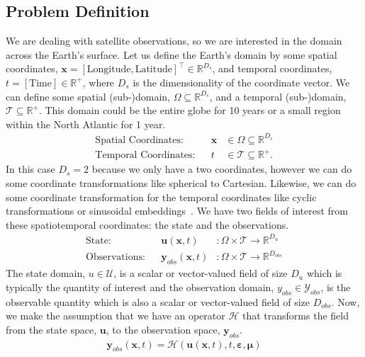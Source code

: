 \subsection{Problem Definition}\label{sec:prob_definition}

We are dealing with satellite observations, so we are interested in the domain across the Earth's surface. 
Let us define the Earth's domain by some spatial coordinates, $\mathbf{x} = [\text{Longitude},\text{Latitude}]^\top \in\mathbb{R}^{D_s}$, and temporal coordinates, $t=[\text{Time}]\in\mathbb{R}^+$, where $D_s$ is the dimensionality of the coordinate vector.  
We can define some spatial (sub-)domain, $\Omega\subseteq\mathbb{R}^{D_s}$, and a temporal (sub-)domain, $\mathcal{T}\subseteq\mathbb{R}^+$. 
This domain could be the entire globe for 10 years or a small region within the North Atlantic for 1 year.
%
%
\begin{align}  \label{eq:spatiotemporal_coords}
    \text{Spatial Coordinates}: && \mathbf{x} &\in \Omega \subseteq \mathbb{R}^{D_s}\\ 
    \text{Temporal Coordinates}: && t &\in \mathcal{T} \subseteq \mathbb{R}^+.
\end{align}
%
%
In this case $D_s=2$ because we only have a two coordinates, however we can do some coordinate transformations like spherical to Cartesian. Likewise, we can do some coordinate transformation for the temporal coordinates like cyclic transformations or sinusoidal embeddings~\cite{ATTENTION}. We have two fields of interest from these spatiotemporal coordinates: the state and the observations.
%
%
\begin{align} \label{eq:state_obs}
    \text{State}: && \boldsymbol{u}(\mathbf{x},t) &: \Omega\times\mathcal{T}\rightarrow\mathbb{R}^{D_u} \\
    \text{Observations}: && \boldsymbol{y}_{obs}(\mathbf{x},t) &: \Omega\times\mathcal{T}\rightarrow\mathbb{R}^{D_{obs}}
\end{align}
%
%
The state domain, $u\in\mathcal{U}$, is a scalar or vector-valued field of size $D_u$ which is typically the quantity of interest and the observation domain, $y_{obs}\in\mathcal{Y}_{obs}$, is the observable quantity which is also a scalar or vector-valued field of size $D_{obs}$. Now, we make the assumption that we have an operator $\mathcal{H}$ that transforms the field from the state space, $\boldsymbol{u}$, to the observation space, $\boldsymbol{y}_{obs}$.
%
%
\begin{align} \label{eq:prob_definition}
    \boldsymbol{y}_{obs}(\mathbf{x},t) = \mathcal{H}\left(\boldsymbol{u}(\mathbf{x},t), t, \boldsymbol{\varepsilon}, \boldsymbol{\mu}\right) 
\end{align}
